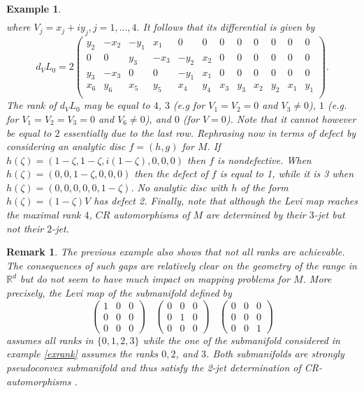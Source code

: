 \documentclass[10pt,a4paper]{amsart}
\newcommand{\R}{\mathbb R}
\newtheorem{remark}[theo]{Remark}
\newtheorem{example}[theo]{Example}
\numberwithin{equation}{section}
\begin{document}
\begin{example}
\begin{eqnarray*}
\end{eqnarray*} 
where $V_j=x_j+iy_j, j=1,\ldots,4.$ It follows that its differential is given by 
$$d_VL_0=
2\begin{pmatrix}
	y_2& -x_2 & -y_1 & x_1 & 0& 0 & 0 & 0 & 0 & 0  & 0 & 0 \\ 
	0& 0  & y_3 & -x_3 & -y_2 & x_2 & 0 & 0 & 0& 0  & 0 & 0\\ 
	y_3& -x_3 & 0 & 0  & -y_1 & x_1 & 0 & 0 & 0  & 0 & 0 & 0\\ 
	x_6& y_6 & x_5 & y_5& x_4 & y_4 & x_3 & y_3 & x_2 & y_2 & x_1 & y_1 \\ 
\end{pmatrix}.$$
The rank of $d_VL_0$ may be equal to $4$, $3$ (e.g for $V_1=V_2=0$ and $V_3 \neq 0$), $1$ (e.g. for $V_1=V_2=V_3=0$ and  $V_6 \neq 0$), and $0$ (for $V=0$). Note that it cannot however be equal to $2$ essentially due to the last row. Rephrasing now in terms of defect by considering an analytic disc $f=(h,g)$ for $M$. If 
$h(\zeta)=(1-\zeta,1-\zeta,i(1-\zeta),0,0,0)$ then $f$ is nondefective. 
When $h(\zeta)=(0,0,1-\zeta,0,0,0)$ then the defect of $f$ is equal to 1, while it is 3 when  $h(\zeta)=(0,0,0,0,0,1-\zeta)$. No analytic disc with 
$h$ of the form $h(\zeta)=(1-\zeta)V$ has defect 2. Finally, note that although the Levi map reaches the maximal rank $4$, $CR$ automorphisms of $M$ are determined by their $3$-jet but not their $2$-jet.          
\end{example}


\begin{remark}
The previous example also shows that not all ranks are achievable. The consequences of such gaps are relatively clear on the geometry of the range in $\R^d$ but do not seem to have much impact on mapping problems for $M$. More precisely, the Levi map of the submanifold
defined by 
$$
\begin{pmatrix}
	1& 0 & 0 \\ 0 &0 & 0 \\ 0 &0 & 0
\end{pmatrix} \ \ \ \ \begin{pmatrix}
	0& 0 & 0 \\ 0 &1 & 0 \\ 0 &0 & 0 
\end{pmatrix}\ \ \ \ \begin{pmatrix}
	0& 0 & 0 \\ 0 &0 & 0 \\ 0 &0 & 1 
\end{pmatrix}$$
assumes all ranks in $\{0,1,2,3\}$ while the one of  the submanifold
considered in example \ref{exrank} assumes the ranks $0,2$, and $3$. Both submanifolds are strongly pseudoconvex submanifold and thus satisfy the 2-jet determination of CR-automorphisms \cite{tu3}.
\end{remark}
\end{document}
